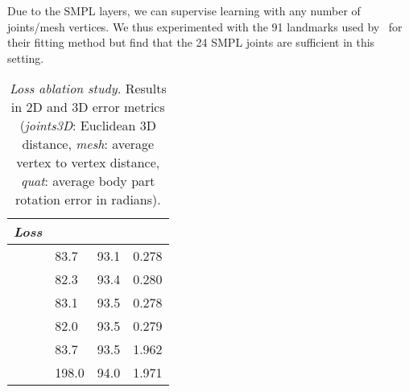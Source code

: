 \documentclass[10pt,twocolumn,letterpaper]{article}
\begin{document}
Due to the SMPL layers, we can supervise learning with any number of joints/mesh vertices. We thus experimented with the 91 landmarks used by~\cite{Lassner:UP:2017} for their fitting method but find that the 24 SMPL joints are sufficient in this setting.
\begin{table}
  \caption{\textit{Loss ablation study.} Results in 2D and 3D error metrics (\textit{joints3D}: Euclidean 3D distance, \textit{mesh}: average vertex to vertex distance, \textit{quat}: average body part rotation error in radians).}\label{wrap-tab:1}
\begin{center}
\small
\begin{tabular*}{1.0\textwidth}{l||x{1.9cm}x{1.05cm}x{1.2cm}}\toprule  
\emph{Loss}                 &    &      &   \\\midrule
                   & 83.7                    & 93.1                 & 0.278                 \\
          & 82.3                    & 93.4                 & 0.280                 \\  
          & 83.1                    & 93.5                 & 0.278                 \\
 & 82.0                    & 93.5                 & 0.279                 \\
                    & 83.7                    & 93.5                 & 1.962                 \\
                    & 198.0                   & 94.0                 & 1.971                 \\
\end{tabular*}
\end{center}
\end{table}
\end{document}
